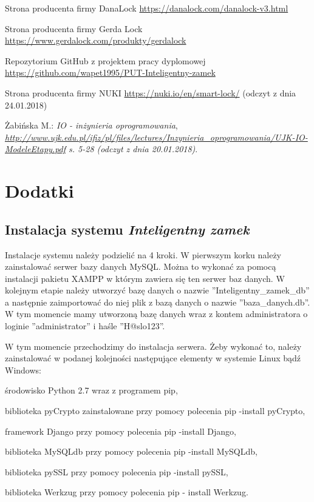 \documentclass[twoside,10pt]{article}
\def\NazwaSys {\textit{Inteligentny zamek}}
\begin{document}
\begin{thebibliography}{99}
Strona producenta firmy DanaLock \href{https://danalock.com/danalock-v3.html}{https://danalock.com/danalock-v3.html}

Strona producenta firmy Gerda Lock \href{https://www.gerdalock.com/produkty/gerdalock}{https://www.gerdalock.com/produkty/gerdalock}

Repozytorium GitHub z projektem pracy dyplomowej
\href{https://github.com/wapet1995/PUT-Inteligentny-zamek}{https://github.com/wapet1995/PUT-Inteligentny-zamek}

Strona producenta firmy NUKI \href{https://nuki.io/en/smart-lock/}{https://nuki.io/en/smart-lock/} (odczyt z dnia 24.01.2018)

Żabińska M.: \textit{IO - inżynieria oprogramowania},\\
\textit{\href{http://www.ujk.edu.pl/ifiz/pl/files/lectures/Inzynieria\_oprogramowania/UJK-IO-ModeleEtapy.pdf}{http://www.ujk.edu.pl/ifiz/pl/files/lectures/Inzynieria\_oprogramowania/UJK-IO-ModeleEtapy.pdf} s. 5-28 (odczyt z dnia 20.01.2018)}.
\end{thebibliography}

\newpage\listoffigures
{}
\listoftables
{}

\newpage
\section*{Dodatki} \label{Dodatki}
\subsection*{Instalacja systemu \NazwaSys}
Instalacje systemu należy podzielić na 4 kroki.
W pierwszym korku należy zainstalować serwer bazy danych MySQL. Można to wykonać za pomocą instalacji pakietu XAMPP w którym zawiera się ten serwer baz danych. W kolejnym etapie należy utworzyć bazę danych o nazwie ''Inteligentny\_zamek\_db'' a następnie zaimportować do niej plik z bazą danych o nazwie ''baza\_danych.db''. W tym momencie mamy utworzoną bazę danych wraz z kontem administratora o loginie ''administrator'' i haśle ''H@slo123''.  

W tym momencie przechodzimy do instalacja serwera. Żeby wykonać to, należy zainstalować w podanej kolejności następujące elementy w systemie Linux bądź Windows:
\begin{itemize*}
\item środowisko Python 2.7 wraz z programem pip,
\item biblioteka pyCrypto zainstalowane przy pomocy polecenia pip -install pyCrypto,
\item  framework Django przy pomocy polecenia pip -install Django,
\item biblioteka MySQLdb przy pomocy polecenia pip -install MySQLdb,
\item  biblioteka pySSL przy pomocy polecenia pip -install pySSL,
\item biblioteka Werkzug przy pomocy polecenia pip - install Werkzug.
\end{itemize*}
\end{document}
